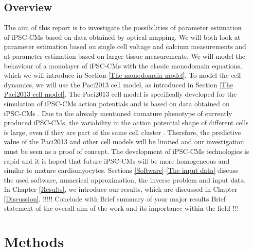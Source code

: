 \documentclass{article}
\begin{document}
\subsection{Overview}
The aim of this report is to investigate the possibilities of parameter estimation of iPSC-CMs based on data obtained by optical mapping. We will both look at parameter estimation based on single cell voltage and calcium measurements and at parameter estimation based on larger tissue measurements.
We will model the behaviour of a monolayer of iPSC-CMs with the classic monodomain equations, which we will introduce in Section \ref{The monodomain model}. To model the cell dynamics, we will use the Paci2013 cell model, as introduced in Section \ref{The Paci2013 cell model}. The Paci2013 cell model is specifically developed for the simulation of iPSC-CMs action potentials and is based on data obtained on iPSC-CMs \cite{Paci2013, Ma2011}. Due to the already mentioned immature phenotype of currently produced iPSC-CMs, the variability in the action potential shape of different cells is large, even if they are part of the same cell cluster \cite{Blazeski, Zhu2016}. Therefore, the predictive value of the Paci2013 and other cell models will be limited and our investigation must be seen as a proof of concept. The development of iPSC-CMs technologies is rapid and it is hoped that future iPSC-CMs will be more homogeneous and similar to mature cardiomyocytes\cite{Denning2016}. Sections \ref{Software}-\ref{The input data} discuss the used software, numerical approximation, the inverse problem and input data. In Chapter \ref{Results}, we introduce our results, which are discussed in Chapter \ref{Discussion}.
%
!!!!!
Conclude with 
Brief summary of your major results
Brief statement of the overall aim of the work and its importance within the field
!!!
%
\section{Methods} \label{Methods}
\end{document}
